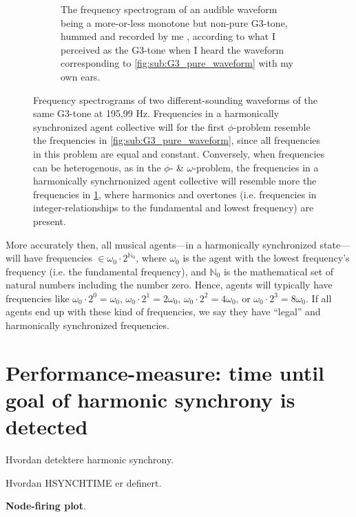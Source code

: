 \begin{figure}[ht!]
\begin{subfigure}[t]{.5\textwidth}
			\caption{The frequency spectrogram of an audible waveform being a more-or-less monotone but non-pure G3-tone, hummed and recorded by me \cite{}, according to what I perceived as the G3-tone when I heard the waveform corresponding to \ref{fig:sub:G3_pure_waveform} with my own ears.}
			\label{fig:sub:G3_hummed_waveform}
		\end{subfigure}
	\caption{Frequency spectrograms of two different-sounding waveforms of the same G3-tone at 195,99 Hz. Frequencies in a harmonically synchronized agent collective will for the first $\phi$-problem resemble the frequencies in \ref{fig:sub:G3_pure_waveform}, since all frequencies in this problem are equal and constant. Conversely, when frequencies can be heterogenous, as in the $\phi$- \& $\omega$-problem, the frequencies in a harmonically synchrnonized agent collective will resemble more the frequencies in \ref{fig:sub:G3_hummed_waveform}, where harmonics and overtones (i.e. frequencies in integer-relationships to the fundamental and lowest frequency) are present.}
	\label{fig:frequency_spectrograms}
\end{figure}






More accurately then, all musical agents—in a harmonically synchronized state—will have frequencies $\in \omega_{0} \cdot 2^{\mathbb{N}_0}$, where $\omega_{0}$ is the agent with the lowest frequency's frequency (i.e. the fundamental frequency), and $\mathbb{N}_0$ is the mathematical set of natural numbers including the number zero. Hence, agents will typically have frequencies like $\omega_{0} \cdot 2^0 = \omega_{0}$, $\omega_{0} \cdot 2^1 = 2\omega_{0}$, $\omega_{0} \cdot 2^2 = 4\omega_{0}$, or $\omega_{0} \cdot 2^3 = 8\omega_{0}$. If all agents end up with these kind of frequencies, we say they have ``legal'' and harmonically synchronized frequencies.







\section{Performance-measure: time until goal of harmonic synchrony is detected}
\label{sec:performance_measure}

Hvordan detektere harmonic synchrony. \nl

Hvordan HSYNCHTIME er definert. \nl

\textbf{Node-firing plot}.